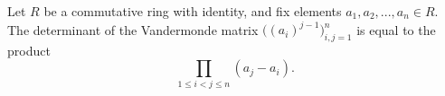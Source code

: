 \documentclass[12pt]{article}
\begin{document}
Let $R$  be a commutative ring with identity, and fix elements  $a_1,a_2,...,a_n \in  R$. The determinant of the Vandermonde matrix  $\big((a_i)^{j-1}\big)_{i,j=1}^n$  is equal to the product  \[\prod_{1 \leq i < j \leq n}(a_j - a_i).\]
\end{document}
